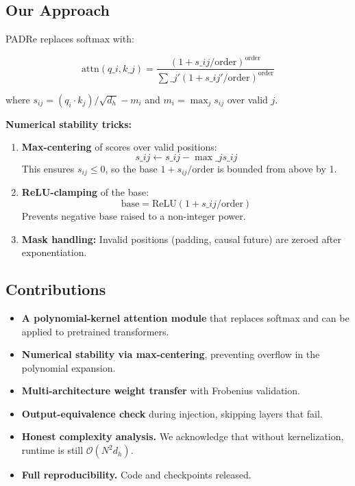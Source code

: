 \subsection{Our Approach}

PADRe replaces softmax with:

\[
\text{attn}(q\_i, k\_j) = \frac{(1 + s\_{ij}/\text{order})^\text{order}}{\sum\_{j'} (1 + s\_{ij'}/\text{order})^\text{order}}
\tag{1.4}
\]

where $s_{ij} = (q_i \cdot k_j)/\sqrt{d_h} - m_i$ and $m_i = \max_j s_{ij}$ over valid $j$.

\textbf{Numerical stability tricks:}

\begin{enumerate}
\item \textbf{Max-centering} of scores over valid positions:
  $$
  s\_{ij} \leftarrow s\_{ij} - \max\_j s\_{ij}
  \tag{1.5}
  $$
  This ensures $s_{ij} \leq 0$, so the base $1 + s_{ij}/\text{order}$ is
  bounded from above by 1.

\item \textbf{ReLU-clamping} of the base:
  $$
  \text{base} = \text{ReLU}(1 + s\_{ij}/\text{order})
  \tag{1.6}
  $$
  Prevents negative base raised to a non-integer power.

\item \textbf{Mask handling:} Invalid positions (padding, causal future) are zeroed
  after exponentiation.

\end{enumerate}
\subsection{Contributions}

\begin{itemize}
\item \textbf{A polynomial-kernel attention module} that replaces softmax and can be
  applied to pretrained transformers.
\item \textbf{Numerical stability via max-centering}, preventing overflow in the
  polynomial expansion.
\item \textbf{Multi-architecture weight transfer} with Frobenius validation.
\item \textbf{Output-equivalence check} during injection, skipping layers that fail.
\item \textbf{Honest complexity analysis.} We acknowledge that without kernelization,
  runtime is still $\mathcal{O}(N^2 d_h)$.
\item \textbf{Full reproducibility.} Code and checkpoints released.

\end{itemize}
